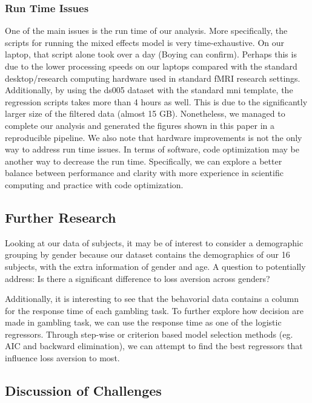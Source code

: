 \documentclass[11pt]{article}
\begin{document}
\subsubsection{Run Time Issues}

One of the main issues is the run time of our analysis. More specifically, 
the scripts for running the mixed effects model is very time-exhaustive. On
our laptop, that script alone took over a day (Boying can confirm). Perhaps
this is due to the lower processing speeds on our laptops compared with the
standard desktop/research computing hardware used in standard fMRI research
settings. Additionally, by using the ds005 dataset with the standard mni 
template, the regression scripts takes more than 4 hours as well. This is due
to the significantly larger size of the filtered data (almost 15 GB). 
Nonetheless, we managed to complete our analysis and generated the figures 
shown in this paper in a reproducible pipeline. We also note that hardware 
improvements is not the only way to address run time issues. In terms of 
software, code optimization may be another way to decrease the run time. 
Specifically, we can explore a better balance between performance and clarity
with more experience in scientific computing and practice with code 
optimization.

\subsection{Further Research}

\par Looking at our data of subjects, it may be of interest to consider a 
demographic grouping by gender because our dataset contains the demographics of 
our 16 subjects, with the extra information of gender and age. A question to 
potentially address: Is there a significant difference to loss aversion across
genders?

\par Additionally, it is interesting to see that the behavorial data contains a 
column for the response time of each gambling task. To further explore how 
decision are made in gambling task, we can use the response time as one of the 
logistic regressors. Through step-wise or criterion based model selection 
methods (eg. AIC and backward elimination), we can attempt to find the best 
regressors that influence loss aversion to most.

\subsection{Discussion of Challenges}
\end{document}
